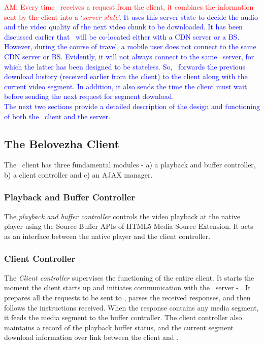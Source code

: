 \indent \textcolor{red}{AM: Every time \servname\ receives a request from the client, it combines the information sent by the client into a `\textit{server state}'}. \textcolor{blue}{ It uses this server state to decide the audio and the video quality of the next video chunk to be downloaded. It has been discussed earlier that \servname\ will be co-located either with a  \ac{CDN} server or a \ac{BS}. However, during the course of travel, a mobile user does not connect to the same \ac{CDN} server or \ac{BS}. Evidently, it will not always connect to the same \servname\ server, for which the latter has been designed to be stateless.  So, \servname\ forwards the previous download history (received earlier from the client) to the client along with the current video segment. In addition, it also sends the time the client must wait before sending the next request for segment download.\\
\indent The next two sections provide a detailed description of the design and functioning of both the \bel\ client and the server.} 
\subsection{The Belovezha Client}
The \bel\ client has three fundamental modules - a) a playback and buffer controller, b) a client controller and c) an AJAX manager. 
\subsubsection{Playback and Buffer Controller}
    The \textit{playback and buffer controller} controls the video playback at the native player using the Source Buffer APIs of HTML5 Media Source Extension. It acts as an interface between the native player and the client controller.
\subsubsection{Client Controller}
The \textit{Client controller} supervises the functioning of the entire client. It starts the moment the client starts up and  initiates communication with the \bel\ server - \servname. It prepares all the requests to be sent to \servname, parses the received responses, and then  follows the instructions received. When the response contains any media segment, it feeds the media segment to the buffer controller. The client controller also maintains a record of the playback buffer status, and the current segment download information over link between the client and \servname.
